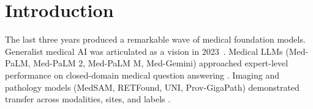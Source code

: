 \section{Introduction}

The last three years produced a remarkable wave of medical foundation models.
Generalist medical AI was articulated as a vision in 2023~\cite{moor2023gmai}.
Medical LLMs (Med-PaLM, Med-PaLM 2, Med-PaLM M, Med-Gemini) approached
expert-level performance on closed-domain medical question answering
\cite{singhal2023medpalm,singhal2025medpalm2,tu2023medpalmm,saab2024medgemini}.
Imaging and pathology models (MedSAM, RETFound, UNI, Prov-GigaPath)
demonstrated transfer across modalities, sites, and labels
\cite{ma2024medsam,zhou2023retfound,chen2024uni,xu2024provgigapath}.
